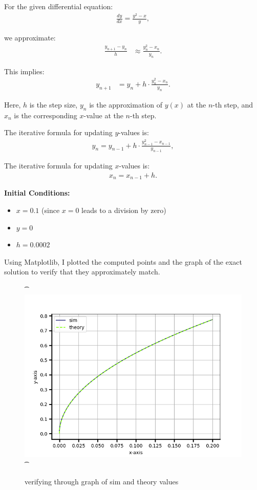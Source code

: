 \documentclass[article]{IEEEtran}
\numberwithin{figure}{enumi}
\begin{document}
For the given differential equation:  
\begin{align}
    \frac{dy}{dx} = \frac{y^2 - x}{y},
\end{align}

we approximate:  
\begin{align}
    \frac{y_{n+1} - y_n}{h} &\approx \frac{y_n^2 - x_n}{y_n}.
\end{align}

This implies:  
\begin{align}
    y_{n+1} &= y_n + h \cdot \frac{y_n^2 - x_n}{y_n}.
\end{align}

Here, $h$ is the step size, $y_n$ is the approximation of $y(x)$ at the $n$-th step, and $x_n$ is the corresponding $x$-value at the $n$-th step.  

\noindent The iterative formula for updating $y$-values is:  
\begin{align}
    y_n = y_{n-1} + h \cdot \frac{y_{n-1}^2 - x_{n-1}}{y_{n-1}},
\end{align}

The iterative formula for updating $x$-values is:  
\begin{align}
    x_n = x_{n-1} + h.
\end{align}

\noindent\textbf{Initial Conditions:}  
\begin{itemize}
    \item $x = 0.1$ (since \(x = 0\) leads to a division by zero)
    \item $y = 0$
    \item $h = 0.0002$
\end{itemize}

Using Matplotlib, I plotted the computed points and the graph of the exact solution to verify that they approximately match.  

\begin{figure}[h!]
\t\centering
\t\includegraphics[width=\columnwidth]{figures/Figure_1.png}
\t\caption{verifying through graph of sim and theory values}
\t\label{stemplot}
\end{figure}
\end{document}

